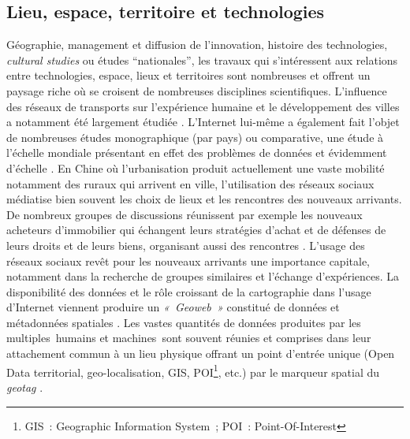 \subsection[Lieu, espace, territoire et technologies]{Lieu, espace, territoire et technologies}
Géographie, management et diffusion de l’innovation, histoire des technologies, \textit{cultural studies} ou études “nationales”, les travaux qui s’intéressent aux relations entre technologies, espace, lieux et territoires sont nombreuses et offrent un paysage riche où se croisent de nombreuses disciplines scientifiques. L’influence des réseaux de transports sur l’expérience humaine et le développement des villes a notamment été largement étudiée \citep{Offner1993,Doulet2001}. L’Internet lui-même a également fait l’objet de nombreuses études monographique (par pays) ou comparative, une étude à l’échelle mondiale présentant en effet des problèmes de données et évidemment d’échelle \citep{Dupuy2004}. En Chine où l'urbanisation produit actuellement une vaste mobilité notamment des ruraux qui arrivent en ville, l'utilisation des réseaux sociaux médiatise bien souvent les choix de lieux et les rencontres des nouveaux arrivants. De nombreux groupes de discussions réunissent par exemple les nouveaux acheteurs d’immobilier qui échangent leurs stratégies d’achat et de défenses de leurs droits et de leurs biens, organisant aussi des rencontres \citep{Li2013}. L’usage des réseaux sociaux revêt pour les nouveaux arrivants une importance capitale, notamment dans la recherche de groupes similaires et l’échange d’expériences. La disponibilité des données et le rôle croissant de la cartographie dans l’usage d’Internet viennent produire un \textit{« Geoweb »} constitué de données et métadonnées spatiales \citep{Crampton2009}. Les vastes quantités de données produites par les multiples humains et machines sont souvent réunies et comprises dans leur attachement commun à un lieu physique \citep{Torrens2010} offrant un point d'entrée unique (Open Data territorial, geo-localisation, GIS, POI\footnote{GIS : Geographic Information System ; POI : Point-Of-Interest}, etc.) par le marqueur spatial du \textit{geotag} \citep{Reference}.

